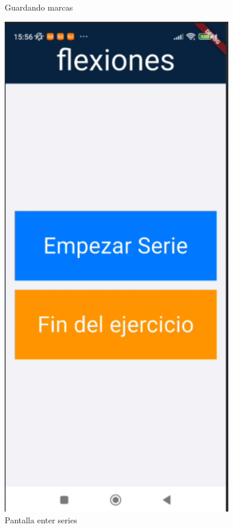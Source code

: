 \begin{figure}[H]
\begin{minipage}{0.4\textwidth}
      \caption{Guardando marcas}
      \label{fig:guardarMarc}
   \end{minipage}%
   \hspace{0.5cm}
   \begin{minipage}{0.4\textwidth}
      \centering
      \includegraphics[width=0.9\textwidth]{pantallas/entreSerie.png}
      \caption{Pantalla enter series}
      \label{fig:entreSerie}
   \end{minipage}
\end{figure}


